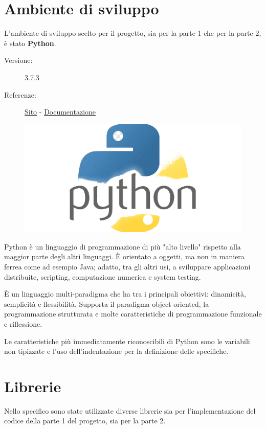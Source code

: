 \documentclass[preprint,12pt]{elsarticle}
\begin{document}
\newpage

\section*{Ambiente di sviluppo}

L'ambiente di sviluppo scelto per il progetto, sia per la parte 1 che per la parte 2, è stato \textbf{Python}.

\medskip
\begin{description}
\item[Versione:] 3.7.3
\item[Referenze:] \href{https://www.python.org}{Sito} - \href{https://docs.python.org/3/}{Documentazione}
\end{description}

\begin{figure}[H]
	\centering
	\includegraphics[width=.3\linewidth]{logo}
\end{figure}

Python è un linguaggio di programmazione di più "alto livello" rispetto alla maggior parte degli altri linguaggi. È orientato a oggetti, ma non in maniera ferrea come ad esempio Java; adatto, tra gli altri usi, a sviluppare applicazioni distribuite, scripting, computazione numerica e system testing.

È un linguaggio multi-paradigma che ha tra i principali obiettivi: dinamicità, semplicità e flessibilità. Supporta il paradigma object oriented, la programmazione strutturata e molte caratteristiche di programmazione funzionale e riflessione.

Le caratteristiche più immediatamente riconoscibili di Python sono le variabili non tipizzate e l'uso dell'indentazione per la definizione delle specifiche. \\

\section*{Librerie}
Nello specifico sono state utilizzate diverse librerie sia per l'implementazione del codice della parte 1 del progetto, sia per la parte 2.
\end{document}
